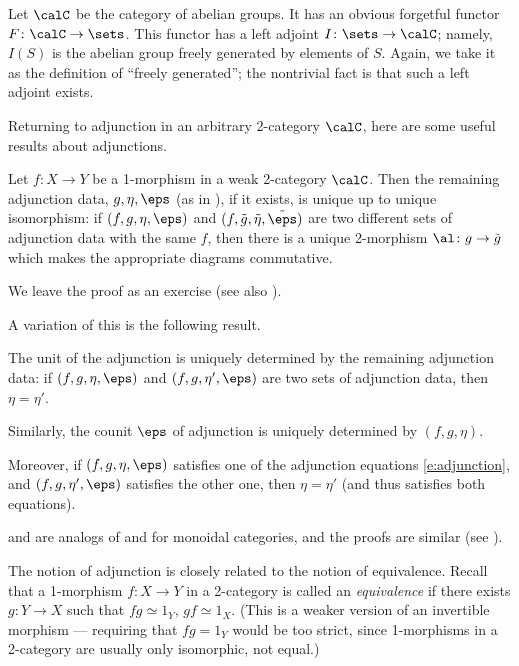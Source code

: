 \begin{example}\label{x:abelian-groups-duality}
  Let $\calC$ be the category of abelian groups. It has an obvious forgetful
  functor $F\colon \calC\to\sets$. This functor has a left adjoint
  $I\colon\sets\to \calC$; namely, $I(S)$ is the abelian group freely generated
  by elements of $S$. Again, we take it as the definition of ``freely
  generated''; the nontrivial fact is that such a left adjoint exists.
\end{example}


Returning to adjunction in an arbitrary 2-category $\calC$,
here are some useful results about adjunctions.

\begin{lemma}\label{l:adjunction-unique}
  Let $f\colon X\to Y$ be a 1-morphism in a weak 2-category $\calC$. Then
  the remaining adjunction data, $g, \eta, \eps$ \textup{(}as in
  \textup{)}, if it exists, is unique up to unique isomorphism: if
  $(f,g,\eta,\eps)$ and $(f, \tilde g, \tilde \eta, \tilde \eps)$ are two
  different sets of adjunction data with the same $f$, then there is a
  unique 2-morphism $\al\colon g\to \tilde g$ which makes the appropriate
  diagrams commutative.
\end{lemma}
We leave the proof as an exercise (see also \cite[Section IV.1]{mac-lane}).

A variation of this is the following result.
\begin{lemma}\label{l:adjunction-unique2}
  The unit of the adjunction is uniquely determined by the remaining
  adjunction data: if $(f, g, \eta, \eps)$ and $(f, g, \eta', \eps)$ are two
  sets of adjunction data, then
  $\eta=\eta'$.

  Similarly, the counit $\eps$ of adjunction is uniquely determined by
  $(f,g, \eta)$.

  Moreover, if $(f, g, \eta, \eps)$ satisfies one of the adjunction equations
  \eqref{e:adjunction}, and $(f, g, \eta', \eps)$ satisfies the other one,
  then $\eta=\eta'$ \textup{(}and thus satisfies both equations\textup{)}.
\end{lemma}
 and  are analogs of
 and  for monoidal categories,
and the proofs are similar (see \cite[Lemma 2.3.8]{lurie-cobordism}).



The notion of adjunction is closely related to the notion of equivalence. Recall
that a 1-morphism $f\colon X\to Y$ in a 2-category is called an
\emph{equivalence} if there exists $g\colon
Y\to X$ such that $fg\simeq 1_Y$, $gf\simeq 1_X$. (This is a weaker version of
an invertible morphism --- requiring that $fg=1_Y$ would be too strict, since
1-morphisms in a 2-category are usually only isomorphic, not equal.)


